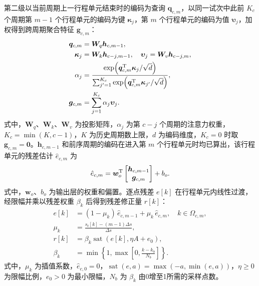 \documentclass{JQR_LaTeX_Template-0507/JQRnew}
\begin{document}
第二级以当前周期上一行程单元结束时的编码为查询 $\bm q_{c,m}$，以同一试次中此前 $K_c$ 个周期第 $m-1$ 个行程单元的编码为键 $\bm\kappa_j$，第 $m$ 个行程单元的编码为值 $\bm\upsilon_j$，加权得到跨周期聚合特征 $\bm g_{c,m}$：
\begin{equation}
	\label{eq:cross-cycle}
	\begin{aligned}
		\bm q_{c,m}&=\bm W_q\bm h_{c,m-1},\\
		\bm\kappa_j&=\bm W_k\bm h_{c-j,m-1},\quad
		\bm\upsilon_j=\bm W_v\bm h_{c-j,m},\\
		\alpha_j&=\frac{\exp\!\left(\bm q_{c,m}^{\rm T}\bm\kappa_j/\sqrt d\right)}
		{\sum_{j'=1}^{K_c}\exp\!\left(\bm q_{c,m}^{\rm T}\bm\kappa_{j'}/\sqrt d\right)},\\
		\bm g_{c,m}&=\sum_{j=1}^{K_c}\alpha_j\bm\upsilon_j.
	\end{aligned}
\end{equation}
式中，$\bm W_q$、$\bm W_k$、$\bm W_v$ 为投影矩阵，$\alpha_j$ 为第 $c-j$ 个周期的注意力权重，$K_c=\min(K,c-1)$，$K$ 为历史周期数上限，$d$ 为编码维度，$K_c=0$ 时取 $\bm g_{c,m}=\bm 0$。$\bm h_{c,m-1}$ 和前序周期的编码在进入第 $m$ 个行程单元时均已算出，该行程单元的残差估计 $\hat e_{c,m}$ 为
\begin{equation}
	\label{eq:cell-output}
	\hat e_{c,m}=\bm w_o^{\rm T}
	\begin{bmatrix}\bm h_{c,m-1}\\\bm g_{c,m}\end{bmatrix}+b_o .
\end{equation}
式中，$\bm w_o$、$b_o$ 为输出层的权重和偏置。逐点残差 $e[k]$ 在行程单元内线性过渡，经限幅并乘以残差权重 $\beta_k$ 后得到残差修正量 $r[k]$：
\begin{equation}
	\label{eq:residual-limit}
	\begin{aligned}
		e[k]&=(1-\mu_k)\,\hat e_{c,m-1}+\mu_k\,\hat e_{c,m},\quad k\in\Omega_{c,m},\\
		\mu_k&=\frac{s_{\mathrm r}[k]-(m-1)\Delta s}{\Delta s},\\
		r[k]&=\beta_k\operatorname{sat}(e[k],\eta A+e_0),\\
		\beta_k&=\min\!\left\{1,\max\!\left[0,\frac{k-k_9}{N_b}\right]\right\}.
	\end{aligned}
\end{equation}
式中，$\mu_k$ 为插值系数，$\hat e_{c,0}=0$，$\operatorname{sat}(e,a)=\max(-a,\min(e,a))$，$\eta\ge0$ 为限幅比例，$e_0>0$ 为最小限幅，$N_b$ 为 $\beta_k$ 由0增至1所需的采样点数。
\end{document}
